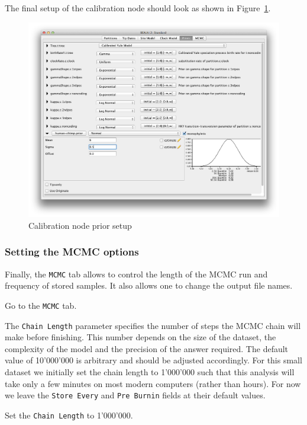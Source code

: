 \documentclass[11pt]{article}
\begin{document}
The final setup of the calibration node should look as shown in Figure~\ref{fig:calibration}.

\begin{figure}[H]
\centering
\includegraphics[width=5in]{figures/calibration.png}
\caption{\small Calibration node prior setup}
\label{fig:calibration}
\end{figure}

\subsubsection{Setting the MCMC options}

Finally, the \texttt{MCMC} tab allows to control the length of the MCMC run and frequency of stored samples. It also allows one to change the output file names.

\begin{framed}
Go to the \texttt{MCMC} tab.
\end{framed}

The \texttt{Chain Length} parameter specifies the number of steps the MCMC chain will make before finishing. This number depends on the size of the dataset, the complexity of the model and the precision of the answer required. The default value of 10'000'000 is arbitrary and should be adjusted accordingly. For this small dataset we initially set the chain length to 1'000'000 such that this analysis will take only a few minutes on most modern computers (rather than hours). For now we leave the \texttt{Store Every} and \texttt{Pre Burnin} fields at their default values.

\begin{framed}
Set the \texttt{Chain Length} to 1'000'000.
\end{framed}
\end{document}
